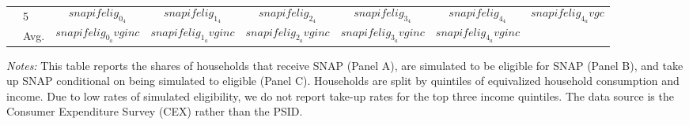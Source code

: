 \begin{table}[t]
\begin{tabular*}{\textwidth}{@{\extracolsep{\fill}}llcccccc@{}}
                                      & 5 & $$snapifelig_0_4$$ & $$snapifelig_1_4$$ & $$snapifelig_2_4$$ & $$snapifelig_3_4$$ & $$snapifelig_4_4$$ & $$snapifelig_4_avgc$$ \\ 
                                      & Avg. & $$snapifelig_0_avginc$$ & $$snapifelig_1_avginc$$ & $$snapifelig_2_avginc$$ & $$snapifelig_3_avginc$$ & $$snapifelig_4_avginc$$ \\                                       \bottomrule
\end{tabular*}
            \begin{spacing}{1}
\begin{tablenotes}
       \item \footnotesize \textit{Notes:} This table reports the shares of households that receive SNAP (Panel A), are simulated to be eligible for SNAP (Panel B), and take up SNAP conditional on being simulated to eligible (Panel C). Households are split by quintiles of equivalized household consumption and income.  Due to low rates of simulated eligibility, we do not report take-up rates for the top three income quintiles. The data source is the Consumer Expenditure Survey (CEX) rather than the PSID. 
      \end{tablenotes}
       \end{spacing}
\end{table}
    

    